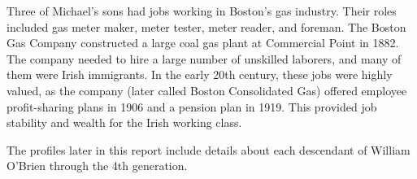 Three of Michael's sons had jobs working in Boston's gas industry. Their roles included gas meter maker, meter tester, meter reader, and foreman. The Boston Gas Company constructed a large coal gas plant at Commercial Point in 1882. The company needed to hire a large number of unskilled laborers, and many of them were Irish immigrants.\cite{Keating:11} In the early 20th century, these jobs were highly valued, as the company (later called Boston Consolidated Gas) offered employee profit-sharing plans in 1906 and a pension plan in 1919. This provided job stability and wealth for the Irish working class.\cite{Keating:20}

The profiles later in this report include details about each descendant of William O'Brien through the 4th generation.
